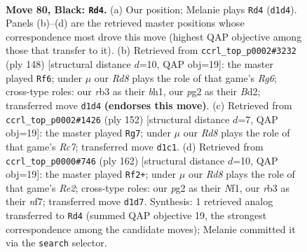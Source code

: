 \documentclass[11pt]{article}
\begin{document}
\clearpage

\begin{figure}[p]\centering
\begin{subfigure}{0.46\textwidth}\centering
\resizebox{\linewidth}{!}{%
\newchessgame
\chessboard[
  setfen={8/8/k7/7K/8/1R6/1N4P1/3r4 b - - 25 80},
  showmover=false,
  pgfstyle=straightmove, color=movearrow, markmove={d1-d4}
]}
\caption{}
\end{subfigure}\hfill
\begin{subfigure}{0.46\textwidth}\centering
\resizebox{\linewidth}{!}{%
\newchessgame
\chessboard[
  setfen={8/3kn3/6R1/8/3K4/8/3B4/7b w - - 39 75},
  showmover=false,
  pgfstyle=straightmove, color=movearrow, markmove={g6-f6}
]}
\caption{}
\end{subfigure}
\\[4pt]
\begin{subfigure}{0.46\textwidth}\centering
\resizebox{\linewidth}{!}{%
\newchessgame
\chessboard[
  setfen={5r2/2R5/8/3n4/8/P4k2/7K/8 w - - 18 77},
  showmover=false,
  pgfstyle=straightmove, color=movearrow, markmove={c7-g7}
]}
\caption{}
\end{subfigure}\hfill
\begin{subfigure}{0.46\textwidth}\centering
\resizebox{\linewidth}{!}{%
\newchessgame
\chessboard[
  setfen={8/5n2/5k2/8/3n2K1/8/4R3/5N2 w - - 25 82},
  showmover=false,
  pgfstyle=straightmove, color=movearrow, markmove={e2-f2}
]}
\caption{}
\end{subfigure}
\caption{\textbf{Move 80, Black: \texttt{Rd4}.} (a) Our position; Melanie plays \texttt{Rd4} (\texttt{d1d4}). Panels (b)--(d) are the retrieved master positions whose correspondence most drove this move (highest QAP objective among those that transfer to it). (b) Retrieved from \texttt{ccrl\_top\_p0002\#3232} (ply 148) [structural distance $d$=10, QAP obj=19]: the master played \texttt{Rf6}; under $\mu$ our \emph{Rd8} plays the role of that game's \emph{Rg6}; cross-type roles: our \emph{r}b3 as their \emph{b}h1, our \emph{p}g2 as their \emph{B}d2; transferred move \texttt{d1d4} \textbf{(endorses this move)}. (c) Retrieved from \texttt{ccrl\_top\_p0002\#1426} (ply 152) [structural distance $d$=7, QAP obj=19]: the master played \texttt{Rg7}; under $\mu$ our \emph{Rd8} plays the role of that game's \emph{Rc7}; transferred move \texttt{d1c1}. (d) Retrieved from \texttt{ccrl\_top\_p0000\#746} (ply 162) [structural distance $d$=10, QAP obj=19]: the master played \texttt{Rf2+}; under $\mu$ our \emph{Rd8} plays the role of that game's \emph{Re2}; cross-type roles: our \emph{p}g2 as their \emph{N}f1, our \emph{r}b3 as their \emph{n}f7; transferred move \texttt{d1d7}. Synthesis: 1 retrieved analog transferred to \texttt{Rd4} (summed QAP objective 19, the strongest correspondence among the candidate moves); Melanie committed it via the \texttt{search} selector.}
\label{fig:thought-m159}
\end{figure}
\end{document}
